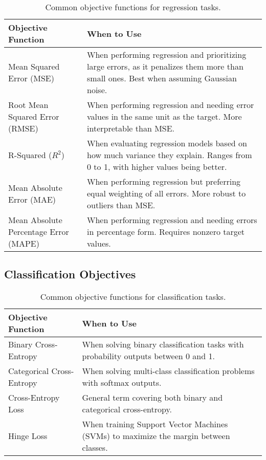 \documentclass[12pt,openany, draft]{book}
\begin{document}
\begin{table}[H]
    \centering
    \small
    \renewcommand{\arraystretch}{1.3}
    \begin{tabular}{|l|p{9cm}|}
        \hline
        \textbf{Objective Function} & \textbf{When to Use} \\
        \hline
        Mean Squared Error (MSE) & When performing regression and prioritizing large errors, as it penalizes them more than small ones. Best when assuming Gaussian noise. \\
        \hline
        Root Mean Squared Error (RMSE) & When performing regression and needing error values in the same unit as the target. More interpretable than MSE. \\
        \hline
        R-Squared (\( R^2 \)) & When evaluating regression models based on how much variance they explain. Ranges from 0 to 1, with higher values being better. \\
        \hline
        Mean Absolute Error (MAE) & When performing regression but preferring equal weighting of all errors. More robust to outliers than MSE. \\
        \hline
        Mean Absolute Percentage Error (MAPE) & When performing regression and needing errors in percentage form. Requires nonzero target values. \\
        \hline
    \end{tabular}
    \caption{Common objective functions for regression tasks.}
\end{table}

\subsection{Classification Objectives}

\begin{table}[H]
    \centering
    \small
    \renewcommand{\arraystretch}{1.3}
    \begin{tabular}{|l|p{9cm}|}
        \hline
        \textbf{Objective Function} & \textbf{When to Use} \\
        \hline
        Binary Cross-Entropy & When solving binary classification tasks with probability outputs between 0 and 1. \\
        \hline
        Categorical Cross-Entropy & When solving multi-class classification problems with softmax outputs. \\
        \hline
        Cross-Entropy Loss & General term covering both binary and categorical cross-entropy. \\
        \hline
        Hinge Loss & When training Support Vector Machines (SVMs) to maximize the margin between classes. \\
        \hline
    \end{tabular}
    \caption{Common objective functions for classification tasks.}
\end{table}
\end{document}
